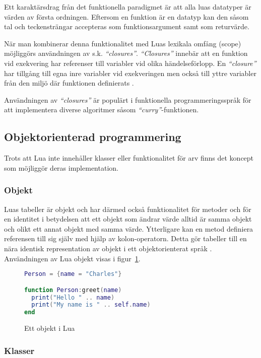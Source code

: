 Ett karaktärsdrag från det funktionella paradigmet är att alla luas datatyper
är värden av första ordningen. Eftersom en funktion är en datatyp kan den såsom
tal och teckensträngar accepteras som funktionsargument samt som returvärde.

När man kombinerar denna funktionalitet med Luas lexikala omfång (scope)
möjliggörs användningen av s.k. \textit{``closures''}. \textit{``Closures''}
innebär att en funktion vid exekvering har referenser till variabler vid olika
händelseförlopp. En \textit{``closure''} har tillgång till egna inre variabler
vid exekveringen men också till yttre variabler från den miljö där funktionen
definierats \citep[s. 45]{ir06}.

Användningen av \textit{``closures''} är populärt i funktionella programmeringsspråk för
att implementera diverse algoritmer såsom \textit{``curry''}-funktionen.

\subsection{Objektorienterad programmering}

Trots att Lua inte innehåller klasser eller funktionalitet för arv finns det
koncept som möjliggör deras implementation.

\subsubsection{Objekt}

Luas tabeller är objekt och har därmed också funktionalitet för metoder och
för en identitet i betydelsen att ett objekt som ändrar värde alltid är samma
objekt och olikt ett annat objekt med samma värde. Ytterligare kan en metod
definiera referensen till sig själv med hjälp av kolon-operatorn. Detta gör
tabeller till en nära identisk representation av objekt i ett objektorienterat
språk \citep[s. 149]{ir06}. Användningen av Lua objekt visas i
figur~\ref{fig:luaobject}.

\begin{figure}[ht]
  \begin{lstlisting}[language=Lua]
Person = {name = "Charles"}

function Person:greet(name)
  print("Hello " .. name)
  print("My name is " .. self.name)
end
  \end{lstlisting}
  \caption{Ett objekt i Lua}
  \label{fig:luaobject}
\end{figure}

\subsubsection{Klasser}

